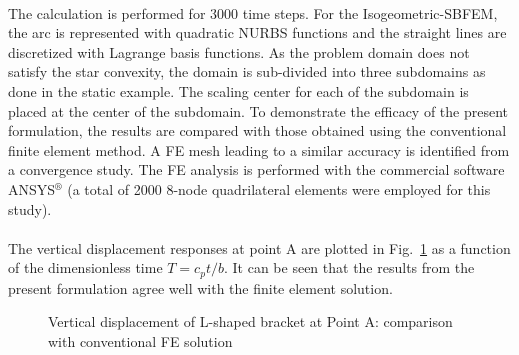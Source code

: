 \paragraph{}
The calculation is performed for 3000 time steps.
For the Isogeometric-SBFEM, the arc is represented with quadratic NURBS functions and the straight lines are discretized with
    Lagrange basis functions.
As the problem domain does not satisfy the star convexity, the domain is sub-divided into three subdomains as done in the static example.
The scaling center for each of the subdomain is placed at the center of the subdomain.
To demonstrate the efficacy of the present formulation, the results are compared with those obtained using the conventional
    finite element method.
A FE mesh leading to a similar accuracy is identified from a convergence study.
The FE analysis is performed with the commercial software ANSYS$^\circledR$ (a total of 2000 8-node quadrilateral elements
    were employed for this study).

\paragraph{}
The vertical displacement responses at point A are plotted in Fig.~\ref{iso_fig:l_uy_dynamic_at_A} as a function of the dimensionless
    time $T = c_pt/b$.
It can be seen that the results from the present formulation agree well with the finite element solution.
    \begin{figure}
        \centering
    \caption{Vertical displacement of L-shaped bracket at Point A: comparison with conventional FE solution}
    \label{iso_fig:l_uy_dynamic_at_A}
    \end{figure}
%
